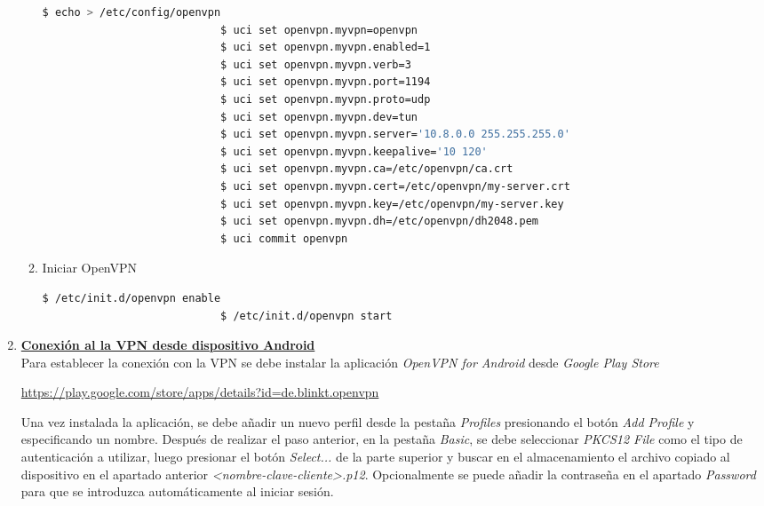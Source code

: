 \documentclass[12pt]{article}
\begin{document}
\begin{enumerate}
\begin{enumerate}
                        \begin{lstlisting}[language=bash]
                            $ echo > /etc/config/openvpn
                            $ uci set openvpn.myvpn=openvpn
                            $ uci set openvpn.myvpn.enabled=1
                            $ uci set openvpn.myvpn.verb=3
                            $ uci set openvpn.myvpn.port=1194
                            $ uci set openvpn.myvpn.proto=udp
                            $ uci set openvpn.myvpn.dev=tun
                            $ uci set openvpn.myvpn.server='10.8.0.0 255.255.255.0'
                            $ uci set openvpn.myvpn.keepalive='10 120'
                            $ uci set openvpn.myvpn.ca=/etc/openvpn/ca.crt
                            $ uci set openvpn.myvpn.cert=/etc/openvpn/my-server.crt
                            $ uci set openvpn.myvpn.key=/etc/openvpn/my-server.key
                            $ uci set openvpn.myvpn.dh=/etc/openvpn/dh2048.pem
                            $ uci commit openvpn
                        \end{lstlisting}

                        \item Iniciar OpenVPN
                        \begin{lstlisting}[language=bash]
                            $ /etc/init.d/openvpn enable
                            $ /etc/init.d/openvpn start
                        \end{lstlisting}
                    \end{enumerate}

                \item \textbf{\underline{Conexión al la VPN desde dispositivo Android}} \\
                Para establecer la conexión con la VPN se debe instalar la aplicación \textit{OpenVPN for Android} desde \textit{Google Play Store}
                
                \url{https://play.google.com/store/apps/details?id=de.blinkt.openvpn}

                Una vez instalada la aplicación, se debe añadir un nuevo perfil desde la pestaña \textit{Profiles} presionando el botón \textit{Add Profile} y especificando un nombre. Después de realizar el paso anterior, en la pestaña \textit{Basic}, se debe seleccionar \textit{PKCS12 File} como el tipo de autenticación a utilizar, luego presionar el botón \textit{Select...} de la parte superior y buscar en el almacenamiento el archivo copiado al dispositivo en el apartado anterior \textit{<nombre-clave-cliente>.p12}. Opcionalmente se puede añadir la contraseña en el apartado \textit{Password} para que se introduzca automáticamente al iniciar sesión.


\end{enumerate}
\end{document}
